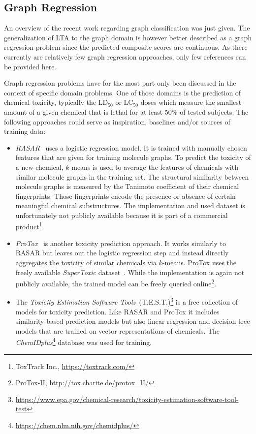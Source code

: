 \documentclass[12pt]{scrartcl}
\begin{document}
\subsection{Graph Regression}%
\label{sec:related-work:gr}

An overview of the recent work regarding graph classification was just given.
The generalization of LTA to the graph domain is however better described as a graph regression problem since the predicted composite scores are continuous.
As there currently are relatively few graph regression approaches, only few references can be provided here.

Graph regression problems have for the most part only been discussed in the context of specific domain problems.
One of those domains is the prediction of chemical toxicity, typically the $\text{LD}_{50}$ or $\text{LC}_{50}$ doses which measure the smallest amount of a given chemical that is lethal for at least $50\%$ of tested subjects.
The following approaches could serve as inspiration, baselines and/or sources of training data:
\begin{itemize}
	\item \textit{RASAR}~\cite{Luechtefeld2018} uses a logistic regression model.
		It is trained with manually chosen features that are given for training molecule graphs.
		To predict the toxicity of a new chemical, $k$-means is used to average the features of chemicals with similar molecule graphs in the training set.
		The structural similarity between molecule graphs is measured by the Tanimoto coefficient of their chemical fingerprints.
		Those fingerprints encode the presence or absence of certain meaningful chemical substructures.
		The implementation and used dataset is unfortunately not publicly available because it is part of a commercial product\footnote{ToxTrack Inc., \url{https://toxtrack.com/}}.
	\item \textit{ProTox}~\cite{Drwal2014}\cite{Banerjee2018} is another toxicity prediction approach.
		It works similarly to RASAR but leaves out the logistic regression step and instead directly aggregates the toxicity of similar chemicals via $k$-means.
		ProTox uses the freely available \textit{SuperToxic} dataset~\cite{Schmidt2009}.
		While the implementation is again not publicly available, the trained model can be freely queried online\footnote{ProTox-II, \url{http://tox.charite.de/protox_II/}}.
	\item The \textit{Toxicity Estimation Software Tools}~(T.E.S.T.)\footnote{\url{https://www.epa.gov/chemical-research/toxicity-estimation-software-tool-test}} is a free collection of models for toxicity prediction.
		Like RASAR and ProTox it includes similarity-based prediction models but also linear regression and decision tree models that are trained on vector representations of chemicals.
		The \textit{ChemIDplus}\footnote{\url{https://chem.nlm.nih.gov/chemidplus/}} database was used for training.
\end{itemize}
\end{document}
